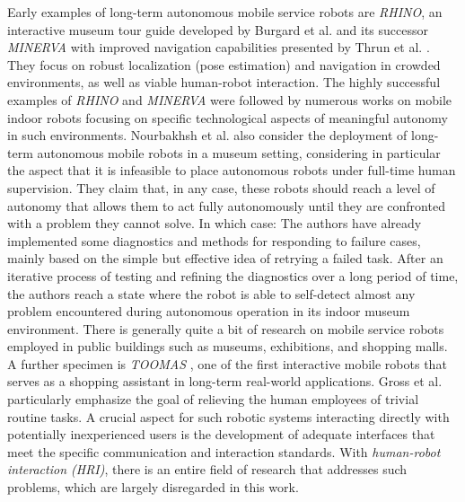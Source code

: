 \documentclass[english, master, utf8]{base/thesis_KBS}
\begin{document}
\noindent
Early examples of long-term autonomous mobile service robots are \textit{RHINO}, an interactive museum tour guide developed by Burgard et al. \cite{Burgard:1998}
and its successor \textit{MINERVA} with improved navigation capabilities presented by Thrun et al. \cite{Thrun:1999}.
They focus on robust localization (pose estimation) and navigation in crowded environments, as well as viable human-robot interaction.\newline
The highly successful examples of \textit{RHINO} and \textit{MINERVA} were followed by numerous works on mobile indoor robots focusing on specific technological aspects of
meaningful autonomy in such environments.
Nourbakhsh et al. \cite{Nourbakhsh:2003} also consider the deployment of long-term autonomous mobile robots in a museum setting, considering in particular the aspect that
it is infeasible to place autonomous robots under full-time human supervision. They claim that, in any case, these robots should reach a level of autonomy that allows them to act
fully autonomously until they are confronted with a problem they cannot solve. In which case:  \cite{Nourbakhsh:2003} The authors have already implemented some diagnostics and methods for responding to failure cases,
mainly based on the simple but effective idea of retrying a failed task. After an iterative process of testing and refining the diagnostics over a long period of time, the
authors reach a state where the robot is able to self-detect almost any problem encountered during autonomous operation in its indoor museum environment.\newline
There is generally quite a bit of research on mobile service robots employed in public buildings such as museums, exhibitions, and shopping malls.
A further specimen is \textit{TOOMAS} \cite{Gross:2009}, one of the first interactive mobile robots that serves as a shopping assistant in long-term real-world applications.
Gross et al. particularly emphasize the goal of relieving the human employees of trivial routine tasks. A crucial aspect for such robotic systems interacting directly with
potentially inexperienced users is the development of adequate interfaces that meet the specific communication and interaction standards. With \textit{human-robot interaction (HRI)},
there is an entire field of research that addresses such problems, which are largely disregarded in this work.\newline
\end{document}
